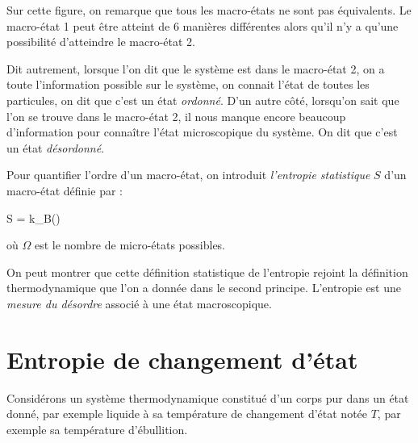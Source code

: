 \documentclass{cours}
\begin{document}
\begin{center}
\end{center}

Sur cette figure, on remarque que tous les macro-états ne sont pas équivalents. Le macro-état 1 peut être atteint de 6 manières différentes alors qu'il n'y a qu'une possibilité d'atteindre le macro-état 2. 

Dit autrement, lorsque l'on dit que le système est dans le macro-état 2, on a toute l'information possible sur le système, on connait l'état de toutes les particules, on dit que c'est un état \textit{ordonné}. D'un autre côté, lorsqu'on sait que l'on se trouve dans le macro-état 2, il nous manque encore beaucoup d'information pour connaître l'état microscopique du système. On dit que c'est un état \textit{désordonné}.

Pour quantifier l'ordre d'un macro-état, on introduit \textit{l'entropie statistique} $S$ d'un macro-état définie par :  
\begin{eqencadre}
  S = k_B\ln(\Omega)
\end{eqencadre}

où $\Omega$ est le nombre de micro-états possibles. 

On peut montrer que cette définition statistique de l'entropie rejoint la définition thermodynamique que l'on a donnée dans le second principe. L'entropie est une \textit{mesure du désordre} associé à une état macroscopique.

\section{Entropie de changement d'état}%
\label{sec:entropie_de_changement_d_etat}
Considérons un système thermodynamique constitué d'un corps pur dans un état donné, par exemple liquide à sa température de changement d'état notée $T$, par exemple sa température d'ébullition.
\end{document}
